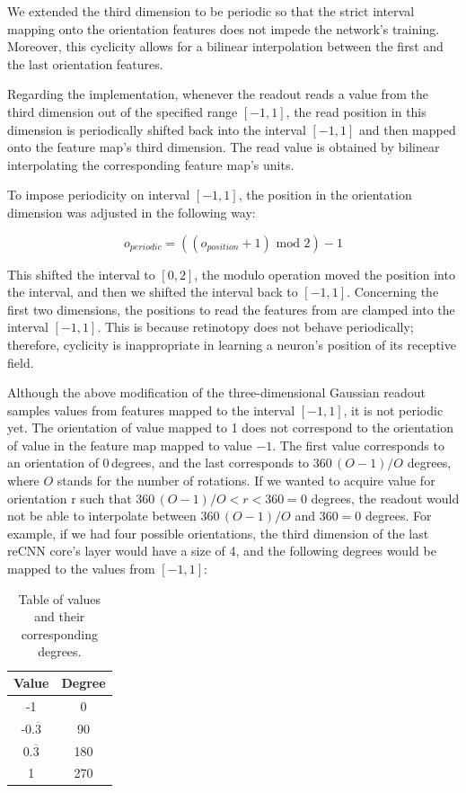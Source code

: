 We extended the third dimension to be periodic so that the strict interval mapping onto the orientation features does not impede the network’s training. Moreover, this cyclicity allows for a bilinear interpolation between the first and the last orientation features.

Regarding the implementation, whenever the readout reads a value from the third dimension out of the specified range $[-1, 1]$, the read position in this dimension is periodically shifted back into the interval $[-1, 1]$ and then mapped onto the feature map’s third dimension. The read value is obtained by bilinear interpolating the corresponding feature map’s units.

To impose periodicity on interval $[-1, 1]$, the position in the orientation dimension was adjusted in the following way:

\begin{equation}
o_{periodic} = ((o_{position} + 1) \text{ mod } 2) - 1
\end{equation}


This shifted the interval to $[0, 2]$, the modulo operation moved the position into the interval, and then we shifted the interval back to $[-1, 1]$. Concerning the first two dimensions, the positions to read the features from are clamped into the interval $[-1, 1]$. This is because retinotopy does not behave periodically; therefore, cyclicity is inappropriate in learning a neuron's position of its receptive field.

Although the above modification of the three-dimensional Gaussian readout samples values from features mapped to the interval $[-1, 1]$, it is not periodic yet. The orientation of value mapped to 1 does not correspond to the orientation of value in the feature map mapped to value $-1$. The first value corresponds to an orientation of 0\,degrees, and the last corresponds to $360\,(O - 1)/O $ degrees, where $O$ stands for the number of rotations. If we wanted to acquire value for orientation r such that $360\,(O - 1)/O < r < 360 = 0$ degrees, the readout would not be able to interpolate between $360\,(O - 1)/O$ and $360 = 0$ degrees. For example, if we had four possible orientations, the third dimension of the last reCNN core’s layer would have a size of 4, and the following degrees would be mapped to the values from $[-1, 1]$:



\begin{table}[H]\centering
	\begin{tabular}{ | c | c | } 
		\hline
		Value & Degree \\
		\hline
		-1 & 0 \\
		-$0.\overline{3}$ & 90 \\
		$0.\overline{3}$ & 180 \\
		1 & 270 \\ 
		\hline
	\end{tabular}
	\caption{Table of values and their corresponding degrees.}\label{tab001}
\end{table}


